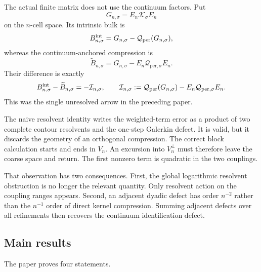 \documentclass[11pt]{article}
\theoremstyle{definition}
\theoremstyle{remark}
\newcommand{\cK}{\mathcal K}
\newcommand{\cQ}{\mathcal Q}
\newcommand{\cI}{\mathcal I}
\newcommand{\Qper}{\cQ_{\mathrm{per},\sigma}}
\begin{document}
The actual finite matrix does not use the continuum factors.  Put
\begin{equation}
 G_{n,\sigma}=E_n\cK_\sigma E_n
 \label{eq:galerkin-intro}
\end{equation}
on the $n$-cell space.  Its intrinsic bulk is
\begin{equation}
 B_{n,\sigma}^{\rm int}
 =G_{n,\sigma}-\cQ_{\rm per}(G_{n,\sigma}),
 \label{eq:intrinsic-bulk-intro}
\end{equation}
whereas the continuum-anchored compression is
\begin{equation}
 \widetilde B_{n,\sigma}
 =G_{n,\sigma}-E_n\Qper E_n.
 \label{eq:anchored-bulk-intro}
\end{equation}
Their difference is exactly
\begin{equation}
 B_{n,\sigma}^{\rm int}-\widetilde B_{n,\sigma}
 =-\cI_{n,\sigma},
 \qquad
 \cI_{n,\sigma}
 :=\cQ_{\rm per}(G_{n,\sigma})-E_n\Qper E_n.
 \label{eq:identification-intro}
\end{equation}
This was the single unresolved arrow in the preceding paper.

The naive resolvent identity writes the weighted-term error as a product of
two complete contour resolvents and the one-step Galerkin defect.  It is
valid, but it discards the geometry of an orthogonal compression.  The
correct block calculation starts and ends in $V_n$.  An excursion into
$V_n^\perp$ must therefore leave the coarse space and return.  The first
nonzero term is quadratic in the two couplings.

That observation has two consequences.  First, the global logarithmic
resolvent obstruction is no longer the relevant quantity.  Only resolvent
action on the coupling ranges appears.  Second, an adjacent dyadic defect
has order $n^{-2}$ rather than the $n^{-1}$ order of direct kernel
compression.  Summing adjacent defects over all refinements then recovers
the continuum identification defect.

\subsection*{Main results}

The paper proves four statements.
\end{document}
